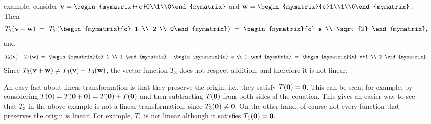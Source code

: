 \begin{solution}
\begin{enumerate}
    example, consider
    $\vect{v}=\begin{mymatrix}{c}0\\1\\0\end{mymatrix}$ and
    $\vect{w}=\begin{mymatrix}{c}1\\1\\0\end{mymatrix}$.
    Then 
    \begin{equation*}
      T_3(\vect{v}+\vect{w})
      ~=~ T_3\tup{\begin{mymatrix}{c} 1 \\ 2 \\ 0\end{mymatrix}}
      ~=~ \begin{mymatrix}{c} e \\ \sqrt{2} \end{mymatrix},
    \end{equation*}
    and
    \begin{equation*}
      T_3(\vect{v})+T_3(\vect{w}) 
      ~=~ \begin{mymatrix}{c} 1 \\ 1 \end{mymatrix}
      + \begin{mymatrix}{c} e \\ 1 \end{mymatrix}
      ~=~ \begin{mymatrix}{c} e+1 \\ 2 \end{mymatrix}.
    \end{equation*}
    Since $T_3(\mbox{\bf v}+\mbox{\bf w})\neq T_3(\mbox{\bf v})+T_3(\mbox{\bf w})$,
    the vector function $T_3$ does not respect addition, and therefore
    it is not linear.
  \end{enumerate}
\end{solution}

An easy fact about linear transformation is that they preserve the
origin, i.e., they satisfy $T(\mbox{\bf 0}) = \mbox{\bf 0}$. This can be seen,
for example, by considering
$T(\mbox{\bf 0}) = T(\mbox{\bf 0}+\mbox{\bf 0}) = T(\mbox{\bf 0}) + T(\mbox{\bf 0})$ and
then subtracting $T(\mbox{\bf 0})$ from both sides of the equation.  This
gives an easier way to see that $T_3$ in the above example is not a
linear transformation, since $T_3(\mbox{\bf 0}) \neq \mbox{\bf 0}$. On the
other hand, of course not every function that preserves the origin is
linear. For example, $T_1$ is not linear although it satisfies
$T_1(\mbox{\bf 0})=\mbox{\bf 0}$.

